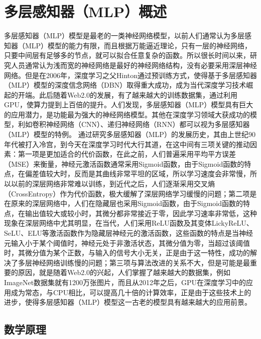\documentclass[UTF8]{article}
\begin{document}
\section{多层感知器（MLP）概述}
多层感知器（MLP）模型是最老的一类神经网络模型，以前人们通常认为多层感知器（MLP）模型的能力有限，而且根据万能逼近理论，只有一层的神经网络，只要中间层有足够多的节点，就可以拟合任意复杂的函数。所以很长时间以来，研究人员通常认为浅而宽的神经网络是最好的神经网络结构，没有必要采用深层神经网络。但是在2006年，深度学习之父Hinton通过预训练方式，使得基于多层感知器（MLP）模型的深度信念网络（DBN）取得重大成功，成为当代深度学习技术崛起的开端。此后随着Web2.0的发展，有了越来越大的训练数据集，通过利用GPU，使算力提到上百倍的提升。人们发现，多层感知器（MLP）模型具有巨大的应用潜力，是功能最为强大的神经网络模型。其他在深度学习领域大获成功的模型，利如卷积神经网络（CNN）、递归神经网络（RNN）都可以视为多层感知器（MLP）模型的特例。\newline
通过研究多层感知器（MLP）的发展历史，其由上世纪90年代被打入冷宫，到今天在深度学习时代大行其道，在这中间有三项关键的推动因素：第一项是更加适合的代价函数，在此之前，人们普遍采用平均平方误差（MSE）来衡量，神经元激活函数通常采用Sigmoid函数，由于Sigmoid函数的特点，在偏差值较大时，反而是其曲线非常平坦的区域，所以学习速度会非常慢，所以以前的深层网络非常难以训练，到近代之后，人们逐渐采用交叉熵（CrossEntropy）作为代价函数，极大缓解了深层网络学习缓慢的问题；第二项是在原来的深层网络中，人们在隐藏层也采用Sigmoid函数，由于Sigmoid函数的特点，在输出值较大或较小时，其微分都非常接近于零，因此学习速率非常低，这种现象在深层网络中尤其明显，在当代，人们采用ReLU函数及其变体LickyReLU、SeLU、ELU等激活函数作为隐藏层神经元的激活函数，这些函数的特点是当神经元输入小于某个阈值时，神经元处于非激活状态，其微分值为零，当超过该阈值时，其微分值为某个正数，与输入的信号大小无关，正是由于这一特性，成功的解决了多层神经网络训练慢的问题；第三项与算法改进的关系不大，但是可能是最重要的原因，就是随着Web2.0的兴起，人们掌握了越来越大的数据集，例如ImageNet数据集就有1200万张图片，而且从2012年之后，GPU在深度学习中的应用成为常态，与CPU相比，可以提高几十倍的计算效率，正是由于这些技术上的进步，使得多层感知器（MLP）模型这一古老的模型具有越来越大的应用前景。
\subsection{数学原理}
\end{document}
